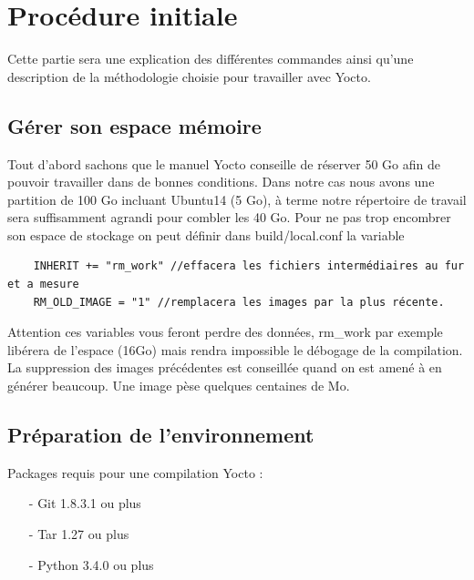 
	\tableofcontents %
	\clearpage
	\mainmatter %

	\section{Procédure initiale}
	Cette partie sera une explication des différentes commandes ainsi qu’une description de la
	méthodologie choisie pour travailler avec Yocto.
	\subsection{Gérer son espace mémoire}

	Tout d’abord sachons que le manuel Yocto conseille de réserver 50 Go afin
	de pouvoir travailler dans de bonnes conditions. Dans notre cas nous avons une
	partition de 100 Go incluant Ubuntu14 (5 Go), à terme notre répertoire de
	travail sera suffisamment agrandi pour combler les 40 Go.
	Pour ne pas trop encombrer son espace de stockage on peut définir dans build/local.conf la variable

	\begin{lstlisting}
	INHERIT += "rm_work" //effacera les fichiers intermédiaires au fur et a mesure
	RM_OLD_IMAGE = "1" //remplacera les images par la plus récente.
	\end{lstlisting}

	Attention ces variables vous feront perdre des données, rm\_work par exemple
	libérera de l'espace (16Go) mais rendra impossible le débogage de la compilation.
	La suppression des images précédentes est conseillée quand on est amené à en
	générer beaucoup. Une image pèse quelques centaines de Mo.
	\subsection{Préparation de l’environnement}
	Packages requis pour une compilation Yocto :

	\begin{itemize}
		\item[-] Git 1.8.3.1 ou plus
		\item[-] Tar 1.27 ou plus
		\item[-] Python 3.4.0 ou plus
	\end{itemize}

